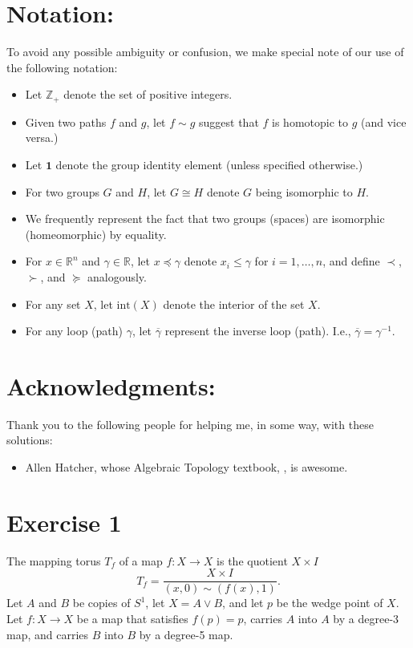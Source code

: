 \documentclass[twoside, titlepage]{amsart}
\theoremstyle{plain} %
\theoremstyle{definition}
\theoremstyle{remark}
\theoremstyle{notation}
\newcommand{\interior}[1]{\text{int}(#1)}
\newcommand{\inv}[1]{\overline{#1}}
\begin{document}
	\section*{Notation:}
	To avoid any possible ambiguity or confusion, we make special note of our use of the following notation:
	\begin{itemize}
		\item Let $\mathbb{Z}_+$ denote the set of positive integers.
		\item Given two paths $f$ and $g$, let $f \sim g$ suggest that $f$ is homotopic to $g$ (and vice versa.)
		\item Let $\textbf{1}$ denote the group identity element (unless specified otherwise.)
		\item For two groups $G$ and $H$, let $G \cong H$ denote $G$ being isomorphic to $H$.
		\item We frequently represent the fact that two groups (spaces) are isomorphic (homeomorphic) by equality.
		\item For $x \in \mathbb{R}^n$ and $\gamma \in \mathbb{R}$, let $x \preceq \gamma$ denote $x_i \leq \gamma$ for $i = 1, \dots, n$, and define $\prec$, $\succ$, and $\succeq$ analogously.
		\item For any set $X$, let $\interior{X}$ denote the interior of the set $X$.
		\item For any loop (path) $\gamma$, let $\inv{\gamma}$ represent the inverse loop (path).  I.e., $\inv{\gamma} = \gamma^{-1}$.
	\end{itemize}
	
	\section*{Acknowledgments:}
	Thank you to the following people for helping me, in some way, with these solutions:
	\begin{itemize}
		\item Allen Hatcher, whose Algebraic Topology textbook, \cite{hatcher01}, is awesome.
	\end{itemize}
	

	\clearpage
	
	\section*{Exercise 1}
	
	The mapping torus $T_f$ of a map $f: X \to X$ is the quotient $X \times I$
	$$T_f = \frac{X \times I}{(x,0) \sim (f(x),1)}.$$
	Let $A$ and $B$ be copies of $S^1$, let $X = A \vee B$, and let $p$ be the wedge point of $X$.  Let $f: X \to X$ be a map that satisfies $f(p) = p$, carries $A$ into $A$ by a degree-3 map, and carries $B$ into $B$ by a degree-5 map.
	
\end{document}
